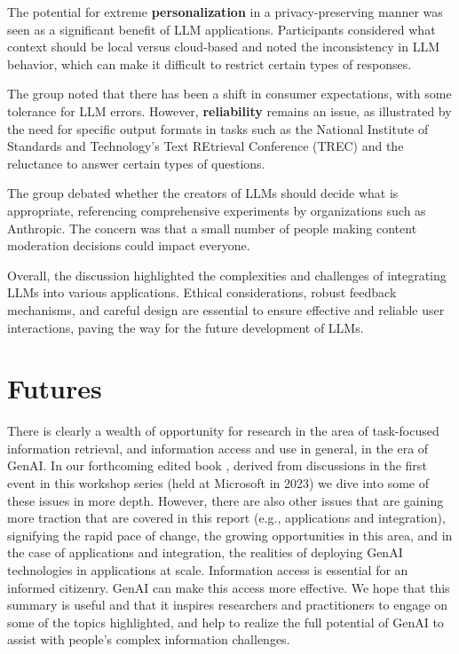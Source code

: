 \documentclass[11pt,dvipdfm]{article}
\begin{document}
The potential for extreme {\bf personalization} in a privacy-preserving manner was seen as a significant benefit of LLM applications. Participants considered what context should be local versus cloud-based and noted the inconsistency in LLM behavior, which can make it difficult to restrict certain types of responses.

The group noted that there has been a shift in consumer expectations, with some tolerance for LLM errors. However, {\bf reliability} remains an issue, as illustrated by the need for specific output formats in tasks such as the National Institute of Standards and Technology's Text REtrieval Conference (TREC) and the reluctance to answer certain types of questions.

The group debated whether the creators of LLMs should decide what is appropriate, referencing comprehensive experiments by organizations such as Anthropic. The concern was that a small number of people making content moderation decisions could impact everyone.

Overall, the discussion highlighted the complexities and challenges of integrating LLMs into various applications. Ethical considerations, robust feedback mechanisms, and careful design are essential to ensure effective and reliable user interactions, paving the way for the future development of LLMs.

\section{Futures}
There is clearly a wealth of opportunity for research in the area of task-focused information retrieval, and information access and use in general, in the era of GenAI. In our forthcoming edited book \cite{whiteshahspringer2025}, derived from discussions in the first event in this workshop series (held at Microsoft in 2023) we dive into some of these issues in more depth. However, there are also other issues that are gaining more traction that are covered in this report (e.g., applications and integration), signifying the rapid pace of change, the growing opportunities in this area, and in the case of applications and integration, the realities of deploying GenAI technologies in applications at scale. Information access is essential for an informed citizenry. GenAI can make this access more effective. We hope that this summary is useful and that it inspires researchers and practitioners to engage on some of the topics highlighted, and help to realize the full potential of GenAI to assist with people's complex information challenges.
\end{document}
